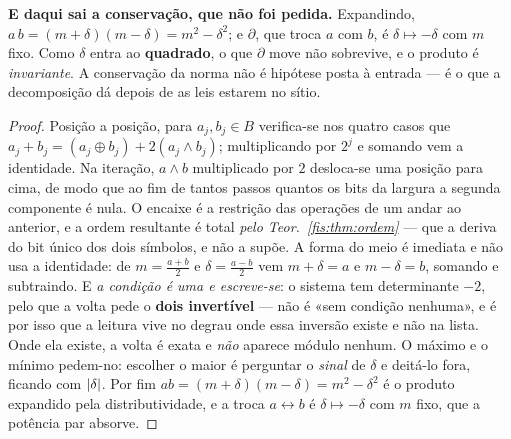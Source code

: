 \documentclass[livro.tex]{subfiles}
\begin{document}
\begin{teorema}
\medskip\noindent\textbf{E daqui sai a conservação, que não foi pedida.}
Expandindo, $a\,b=(m+\delta)(m-\delta)=m^{2}-\delta^{2}$; e $\partial$, que troca
$a$ com $b$, é $\delta\mapsto-\delta$ com $m$ fixo. Como $\delta$ entra ao
\textbf{quadrado}, o que $\partial$ move não sobrevive, e o produto é
\emph{invariante}. A conservação da norma não é hipótese posta à entrada --- é o
que a decomposição dá depois de as leis estarem no sítio.
\end{teorema}

\begin{proof}
Posição a posição, para $a_j,b_j\in B$ verifica-se nos quatro casos que
$a_j+b_j=(a_j\oplus b_j)+2(a_j\wedge b_j)$; multiplicando por $2^{j}$ e somando
vem a identidade. Na iteração, $a\wedge b$ multiplicado por $2$ desloca-se uma
posição para cima, de modo que ao fim de tantos passos quantos os bits da largura
a segunda componente é nula. O encaixe é a restrição das operações de um andar ao
anterior, e a ordem resultante é total \emph{pelo Teor.~\ref{fis:thm:ordem}} ---
que a deriva do bit único dos dois símbolos, e não a supõe.
A forma do meio é imediata e não usa a identidade: de $m=\tfrac{a+b}{2}$ e
$\delta=\tfrac{a-b}{2}$ vem $m+\delta=a$ e $m-\delta=b$, somando e subtraindo. E
\emph{a condição é uma e escreve-se}: o sistema tem determinante $-2$, pelo que
a volta pede o \textbf{dois invertível} --- não é «sem condição nenhuma», e é
por isso que a leitura vive no degrau onde essa inversão existe e não na lista.
Onde ela existe, a volta é exata e \emph{não} aparece módulo nenhum. O máximo e
o mínimo pedem-no: escolher o maior é perguntar o \emph{sinal} de $\delta$ e
deitá-lo fora, ficando com $\lvert \delta\rvert$. Por fim
$ab=(m+\delta)(m-\delta)=m^{2}-\delta^{2}$ é o produto expandido pela
distributividade, e a troca $a\leftrightarrow b$ é $\delta\mapsto-\delta$ com $m$
fixo, que a potência par absorve.
\end{proof}

\end{document}
